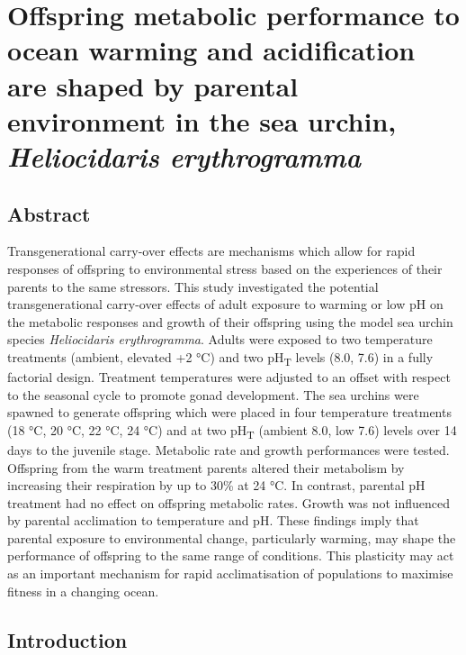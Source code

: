 \documentclass[a4paper,10pt, oneside]{memoir}
\begin{document}
\hypertarget{transgen}{%
\chapter{\texorpdfstring{Offspring metabolic performance to ocean warming and acidification are shaped by parental environment in the sea urchin, \emph{Heliocidaris erythrogramma}}{Offspring metabolic performance to ocean warming and acidification are shaped by parental environment in the sea urchin, Heliocidaris erythrogramma}}\label{transgen}}


\hypertarget{abstract-3}{%
\section*{Abstract}\label{abstract-3}}

Transgenerational carry-over effects are mechanisms which allow for rapid responses of offspring to environmental stress based on the experiences of their parents to the same stressors.
This study investigated the potential transgenerational carry-over effects of adult exposure to warming or low pH on the metabolic responses and growth of their offspring using the model sea urchin species \emph{Heliocidaris erythrogramma}.
Adults were exposed to two temperature treatments (ambient, elevated +2 °C) and two pH\textsubscript{T} levels (8.0, 7.6) in a fully factorial design.
Treatment temperatures were adjusted to an offset with respect to the seasonal cycle to promote gonad development.
The sea urchins were spawned to generate offspring which were placed in four temperature treatments (18 °C, 20 °C, 22 °C, 24 °C) and at two pH\textsubscript{T} (ambient 8.0, low 7.6) levels over 14 days to the juvenile stage.
Metabolic rate and growth performances were tested.
Offspring from the warm treatment parents altered their metabolism by increasing their respiration by up to 30\% at 24 °C.
In contrast, parental pH treatment had no effect on offspring metabolic rates.
Growth was not influenced by parental acclimation to temperature and pH.
These findings imply that parental exposure to environmental change, particularly warming, may shape the performance of offspring to the same range of conditions. This plasticity may act as an important mechanism for rapid acclimatisation of populations to maximise fitness in a changing ocean.

\hypertarget{introduction-2}{%
\section{Introduction}\label{introduction-2}}
\end{document}
